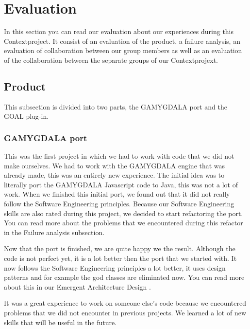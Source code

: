 \section{Evaluation}
In this section you can read our evaluation about our experiences during this Contextproject. It consist of an evaluation of the product, a failure analysis, an evaluation of collaboration between our group members as well as an evaluation of the collaboration between the separate groups of our Contextprojext.

\subsection{Product}
This subsection is divided into two parts, the GAMYGDALA port and the GOAL plug-in.
\subsubsection{GAMYGDALA port}
This was the first project in which we had to work with code that we did not make ourselves. We had to work with the GAMYGDALA engine that was already made, this was an entirely new experience. The initial idea was to literally port the GAMYGDALA Javascript code to Java, this was not a lot of work. When we finished this initial port, we found out that it did not really follow the Software Engineering principles. Because our Software Engineering skills are also rated during this project, we decided to start refactoring the port. You can read more about the problems that we encountered during this refactor in the Failure analysis subsection. \par
Now that the port is finished, we are quite happy we the result. Although the code is not perfect yet, it is a lot better then the port that we started with. It now follows the Software Engineering principles a lot better, it uses design patterns and for example the god classes are eliminated now. You can read more about this in our Emergent Architecture Design \citep{ead}. \par
It was a great experience to work on someone else's code because we encountered problems that we did not encounter in previous projects. We learned a  lot of new skills that will be useful in the future.
